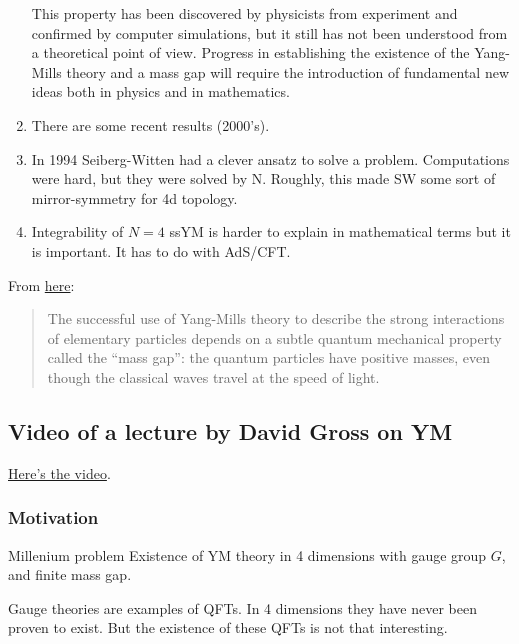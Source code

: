\begin{enumerate}
 This property has been discovered by physicists from experiment and confirmed
 by computer simulations, but it still has not been understood from a
 theoretical point of view. Progress in establishing the existence of the
 Yang-Mills theory and a mass gap will require the introduction of fundamental
 new ideas both in physics and in mathematics.
\item There are some recent results (2000's).
\item In 1994 Seiberg-Witten had a clever ansatz to solve a problem.
Computations were hard, but they were solved by N. Roughly, this made SW some
sort of mirror-symmetry for 4d topology.
\item Integrability of $N=4$ ssYM is harder to explain in mathematical terms but
it is important. It has to do with AdS/CFT.
\end{enumerate}

From \href{https://www.claymath.org/millennium/yang-mills-the-maths-gap/}{here}:
{\color{3}\begin{quotation}
 The successful use of Yang-Mills theory to describe the strong interactions of
 elementary particles depends on a subtle quantum mechanical property called the
 “mass gap”: the quantum particles have positive masses, even though the
 classical waves travel at the speed of light.
\end{quotation}}

\subsection{Video of a lecture by David Gross on YM}

\href{https://www.youtube.com/watch?v=vMiY7zlBOFI}{Here's the video}.

\subsubsection{Motivation}

\begin{thing4}{Millenium problem}\leavevmode
Existence of YM theory in 4 dimensions with gauge group $G$, and finite mass
gap.
\end{thing4}
Gauge theories are examples of QFTs. In 4 dimensions they have never been proven
to exist. But the existence of these QFTs is not that interesting.

